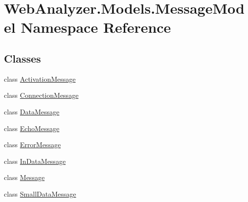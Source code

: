 \hypertarget{namespace_web_analyzer_1_1_models_1_1_message_model}{}\section{Web\+Analyzer.\+Models.\+Message\+Model Namespace Reference}
\label{namespace_web_analyzer_1_1_models_1_1_message_model}
\subsection*{Classes}
\begin{DoxyCompactItemize}
\item 
class \hyperlink{class_web_analyzer_1_1_models_1_1_message_model_1_1_activation_message}{Activation\+Message}
\item 
class \hyperlink{class_web_analyzer_1_1_models_1_1_message_model_1_1_connection_message}{Connection\+Message}
\item 
class \hyperlink{class_web_analyzer_1_1_models_1_1_message_model_1_1_data_message}{Data\+Message}
\item 
class \hyperlink{class_web_analyzer_1_1_models_1_1_message_model_1_1_echo_message}{Echo\+Message}
\item 
class \hyperlink{class_web_analyzer_1_1_models_1_1_message_model_1_1_error_message}{Error\+Message}
\item 
class \hyperlink{class_web_analyzer_1_1_models_1_1_message_model_1_1_in_data_message}{In\+Data\+Message}
\item 
class \hyperlink{class_web_analyzer_1_1_models_1_1_message_model_1_1_message}{Message}
\item 
class \hyperlink{class_web_analyzer_1_1_models_1_1_message_model_1_1_small_data_message}{Small\+Data\+Message}
\end{DoxyCompactItemize}
